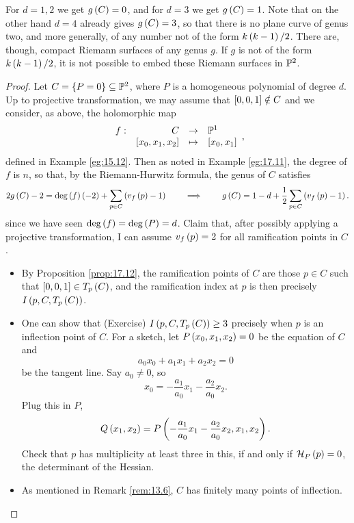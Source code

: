 \begin{remark}
For $ d = 1, 2 $ we get $ g\rb{C} = 0 $, and for $ d = 3 $ we get $ g\rb{C} = 1 $. Note that on the other hand $ d = 4 $ already gives $ g\rb{C} = 3 $, so that there is no plane curve of genus two, and more generally, of any number not of the form $ k\rb{k - 1} / 2 $. There are, though, compact Riemann surfaces of any genus $ g $. If $ g $ is not of the form $ k\rb{k - 1} / 2 $, it is not possible to embed these Riemann surfaces in $ \P^2 $.
\end{remark}


\begin{proof}
Let $ C = \cb{P = 0} \subseteq \P^2 $, where $ P $ is a homogeneous polynomial of degree $ d $. Up to projective transformation, we may assume that $ \sb{0, 0, 1} \notin C $ and we consider, as above, the holomorphic map
$$ \function[f]{C}{\P^1}{\sb{x_0, x_1, x_2}}{\sb{x_0, x_1}}, $$
defined in Example \ref{eg:15.12}. Then as noted in Example \ref{eg:17.11}, the degree of $ f $ is $ n $, so that, by the Riemann-Hurwitz formula, the genus of $ C $ satisfies
$$ 2g\rb{C} - 2 = \deg\rb{f}\rb{-2} + \sum_{p \in C} \rb{v_f\rb{p} - 1} \qquad \implies \qquad g\rb{C} = 1 - d + \dfrac{1}{2}\sum_{p \in C} \rb{v_f\rb{p} - 1}. $$
since we have seen $ \deg\rb{f} = \deg\rb{P} = d $. Claim that, after possibly applying a projective transformation, I can assume $ v_f\rb{p} = 2 $ for all ramification points in $ C $.
\begin{itemize}
\item By Proposition \ref{prop:17.12}, the ramification points of $ C $ are those $ p \in C $ such that $ \sb{0, 0, 1} \in T_p\rb{C} $, and the ramification index at $ p $ is then precisely $ I\rb{p, C, T_p\rb{C}} $.
\item One can show that (Exercise) $ I\rb{p, C, T_p\rb{C}} \ge 3 $ precisely when $ p $ is an inflection point of $ C $. For a sketch, let $ P\rb{x_0, x_1, x_2} = 0 $ be the equation of $ C $ and
$$ a_0x_0 + a_1x_1 + a_2x_2 = 0 $$
be the tangent line. Say $ a_0 \ne 0 $, so
$$ x_0 = -\dfrac{a_1}{a_0}x_1 - \dfrac{a_2}{a_0}x_2. $$
Plug this in $ P $,
$$ Q\rb{x_1, x_2} = P\rb{-\dfrac{a_1}{a_0}x_1 - \dfrac{a_2}{a_0}x_2, x_1, x_2}. $$
Check that $ p $ has multiplicity at least three in this, if and only if $ \HH_P\rb{p} = 0 $, the determinant of the Hessian.
\item As mentioned in Remark \ref{rem:13.6}, $ C $ has finitely many points of inflection.
\end{itemize}

\end{proof}
